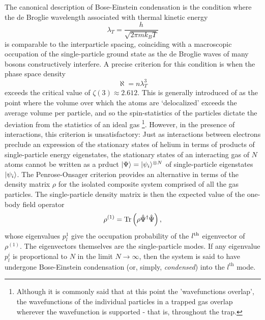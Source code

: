 	The canonical description of Bose-Einstein condensation is the condition where the de Broglie wavelength associated with thermal kinetic energy
	\begin{equation}
		\lambda_T = \frac{h}{\sqrt{2\pi m k_B T}}
	\end{equation}
	is comparable to the interparticle spacing, coinciding with a macroscopic occupation of the single-particle ground state as the de Broglie waves of many bosons constructively interfere.
	A precise criterion for this condition is when the phase space density
	\begin{equation}
		\aleph = n \lambda_T^3
	\end{equation}
	exceeds the critical value of $\zeta(3)\approx2.612$. 
	This is generally introduced of as the point where the volume over which the atoms are `delocalized'  exceeds the average volume per particle, and so the spin-statistics of the particles dictate the deviation from the statistics of an ideal gas \footnote{Although it is commonly said that at this point the 'wavefunctions overlap', the wavefunctions of the individual particles in a trapped gas overlap wherever the wavefunction is supported - that is, throughout the trap.}.
	However, in the presence of interactions, this criterion is unsatisfactory: Just as interactions between electrons preclude an expression of the stationary states of helium in terms of products of single-particle energy eigenstates, the stationary states of an interacting gas of $N$ atoms cannot be written as a prduct $|\Psi\rangle = |\psi_i\rangle^{\otimes N}$ of single-particle eigenstates $|\psi_i\rangle$.
	The Penrose-Onsager criterion \cite{penrose56} provides an alternative in terms of the density matrix $\rho$ for the isolated composite system comprised of all the gas particles.
	The single-particle density matrix is then the expected value of the one-body field operator
	\begin{equation}
		\rho^{(1)} = \textrm{Tr}\left(\rho\hat{\Psi}^\dagger\hat{\Psi}\right),
	\end{equation}
	whose eigenvalues $p_{l}^{1}$ give the occupation probability of the $l^{\rm th}$ eigenvector of $\rho^{(1)}$.
	The eigenvectors themselves are the single-particle modes.
	If any eigenvalue $p_{l}^{i}$ is proportional to $N$ in the limit $N\rightarrow\infty$, then the system is said to have undergone Bose-Einstein condensation (or, simply, \emph{condensed}) into the $l^\textrm{th}$ mode.
	
